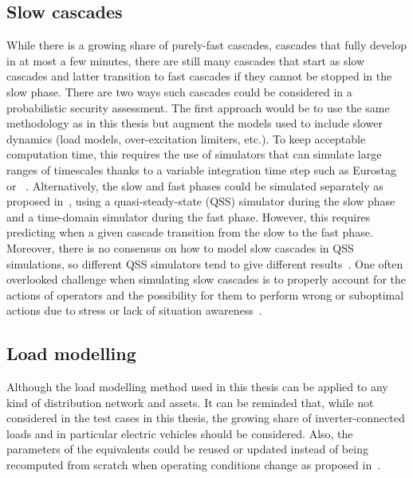 
\subsection*{Slow cascades}

While there is a growing share of purely-fast cascades, \ie cascades that fully develop in at most a few minutes, there are still many cascades that start as slow cascades and latter transition to fast cascades if they cannot be stopped in the slow phase. There are two ways such cascades could be considered in a probabilistic security assessment. The first approach would be to use the same methodology as in this thesis but augment the models used to include slower dynamics (load models, over-excitation limiters, etc.). To keep acceptable computation time, this requires the use of simulators that can simulate large ranges of timescales thanks to a variable integration time step such as Eurostag~\cite{STAG} or \Dynawo{}~\cite{Dynawo}. Alternatively, the slow and fast phases could be simulated separately as proposed in~\cite{TwoLevelPSA}, using a quasi-steady-state (QSS) simulator during the slow phase and a time-domain simulator during the fast phase. However, this requires predicting when a given cascade transition from the slow to the fast phase. Moreover, there is no consensus on how to model slow cascades in QSS simulations, so different QSS simulators tend to give different results~\cite{Benchmarking2018}. One often overlooked challenge when simulating slow cascades is to properly account for the actions of operators and the possibility for them to perform wrong or suboptimal actions due to stress or lack of situation awareness~\cite{Shahab_HRA, Panteli_Awareness}.

\subsection*{Load modelling}

Although the load modelling method used in this thesis can be applied to any kind of distribution network and assets. It can be reminded that, while not considered in the test cases in this thesis, the growing share of inverter-connected loads and in particular electric vehicles should be considered. Also, the parameters of the equivalents could be reused or updated instead of being recomputed from scratch when operating conditions change as proposed in~\cite{ChaspierreThesis}.
